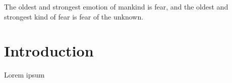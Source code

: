 
\begin{savequote}[80mm]
    {The oldest and strongest emotion of mankind is fear, and the oldest and strongest kind of fear is fear of the unknown.}

\end{savequote}

\chapter{Introduction}
\label{chap:first_chapter}

  \lettrine[lines=4,findent=5pt]{\textcolor{stdgrey}{L}}{}orem ipsum 

   








